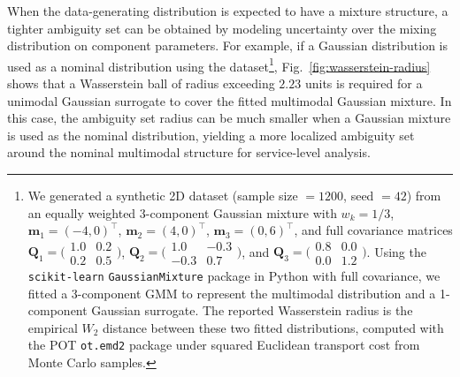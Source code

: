 \documentclass[opre,sglanonrev]{informs4}
\newcommand{\bmean}{\bm{m}}
\newcommand{\bQ}{\bm Q}
\begin{document}
When the data-generating distribution is expected to have a mixture structure, a tighter ambiguity set can be obtained by modeling uncertainty over the mixing distribution on component parameters. For example, if a Gaussian distribution is used as a nominal distribution using the dataset\footnote{We generated a synthetic 2D dataset (sample size \(=1200\), seed \(=42\)) from an equally weighted 3-component Gaussian mixture with \(w_k=1/3\), \(\bmean_1=(-4,0)^\top\), \(\bmean_2=(4,0)^\top\), \(\bmean_3=(0,6)^\top\), and full covariance matrices \(\bQ_1=\bigl(\begin{smallmatrix}1.0&0.2\\0.2&0.5\end{smallmatrix}\bigr)\), \(\bQ_2=\bigl(\begin{smallmatrix}1.0&-0.3\\-0.3&0.7\end{smallmatrix}\bigr)\), and \(\bQ_3=\bigl(\begin{smallmatrix}0.8&0.0\\0.0&1.2\end{smallmatrix}\bigr)\). Using the \texttt{scikit-learn} \texttt{GaussianMixture} package in Python with full covariance, we fitted a 3-component GMM to represent the multimodal distribution and a 1-component Gaussian surrogate. The reported Wasserstein radius is the empirical \(W_2\) distance between these two fitted distributions, computed with the POT \texttt{ot.emd2} package under squared Euclidean transport cost from Monte Carlo samples.}, Fig.~\ref{fig:wasserstein-radius} shows that a Wasserstein ball of radius exceeding $2.23$ units is required for a unimodal Gaussian surrogate to cover the fitted multimodal Gaussian mixture. In this case, the ambiguity set radius can be much smaller when a Gaussian mixture is used as the nominal distribution, yielding a more localized ambiguity set around the nominal multimodal structure for service-level analysis.
\end{document}
